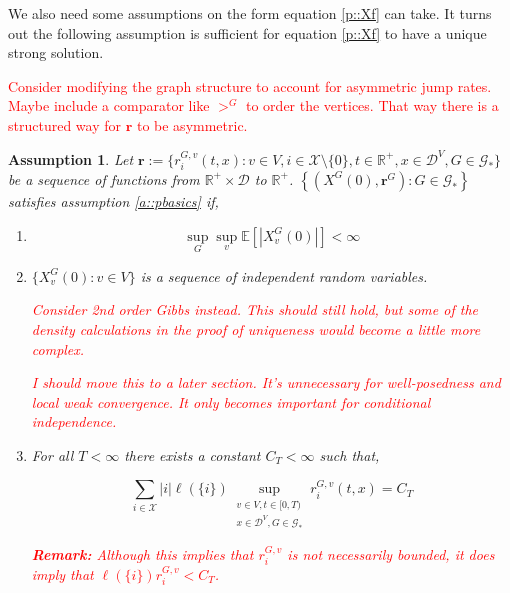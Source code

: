 \documentclass[12pt]{article}
\newcommand{\mb}{\mathbb}
\newcommand{\mc}{\mathcal}
\newcommand{\tr}{\textcolor{red}}
\newcommand{\remark}{\textbf{Remark: }}
\newcommand{\ind}{\hspace{24pt}}
\newcommand{\ex}[1]{\mb{E}\left[#1\right]}			%
\newcommand{\defeq}{:=}								%
\newcommand{\cad}{\mc{D}}							%
\newcommand{\sta}{\mc{X}}							%
\newcommand{\Xf}{X}									%
\newcommand{\Sm}{\ell}								%
\newcommand{\rate}{r}								%
\newcommand{\xf}{x}									%
\newcommand{\vind}[1]{_{#1}}						%
\newcommand{\tme}[1]{(#1)}							%
\newcommand{\gind}[1]{^{#1}}						%
\newcommand{\vpara}[1]{^{#1}}						%
\newcommand{\stpara}[1]{_{#1}}						%
\newcommand{\gvpara}[2]{^{#1,#2}}					%
\newcommand{\rateset}{\mathbf{\rate}}				%
\newcommand{\jumpbd}[1]{C_{#1}}						%
\newcommand{\tmepro}[2]{(#1,#2)}					%
\newcommand{\Gs}{\mc{G}_\ast}						%
\newtheorem{assu}[thms]{Assumption}
\begin{document}
We also need some assumptions on the form equation \eqref{p::Xf} can take. It turns out the following assumption is sufficient for equation \eqref{p::Xf} to have a unique strong solution.

\tr{Consider modifying the graph structure to account for asymmetric jump rates. Maybe include a comparator like \(>\gind{G}\) to order the vertices. That way there is a structured way for \(\rateset\) to be asymmetric.}

\begin{assu}
Let \(\rateset \defeq \{\rate\gvpara{G}{v}\stpara{i}\tmepro{t}{x}:v \in V,i \in \sta\setminus\{0\},t \in \mb{R}^+, x \in \cad\vpara{V}, G \in \Gs\}\) be a sequence of functions from \(\mb{R}^+\times \cad\) to \(\mb{R}^+\). \(\left\{(\Xf\gind{G}\tme{0},\rateset\gind{G}): G \in \Gs\right\}\) satisfies assumption \ref{a::pbasics} if,

\begin{enumerate}
\item 

\begin{equation}
\sup_G\sup_v \ex{|\Xf\gind{G}\vind{v}\tme{0}|} < \infty
\label{a::bddstart}
\end{equation}

\item \(\{\Xf\gind{G}\vind{v}\tme{0}:v \in V\}\) is a sequence of independent random variables. 

\tr{\ind Consider 2nd order Gibbs instead. This should still hold, but some of the density calculations in the proof of uniqueness would become a little more complex.} 

\tr{\ind I should move this to a later section. It's unnecessary for well-posedness and local weak convergence. It only becomes important for conditional independence.}

\item For all \(T < \infty\) there exists a constant \(\jumpbd{T} < \infty\) such that,

\begin{equation}
\sum_{i \in \sta}|i|\Sm(\{i\})\sup_{\substack{v \in V,t \in [0,T)\\\xf \in \cad\vpara{V},G \in \Gs}} \rate\gvpara{G}{v}\stpara{i}\tmepro{t}{\xf} = \jumpbd{T}
\label{a::bddjmp}
\end{equation}

\tr{\remark Although this implies that \(\rate\gvpara{G}{v}\stpara{i}\) is not necessarily bounded, it does imply that \(\Sm(\{i\})\rate\gvpara{G}{v}\stpara{i} < \jumpbd{T}\).}


\end{enumerate}
\end{assu}
\end{document}
